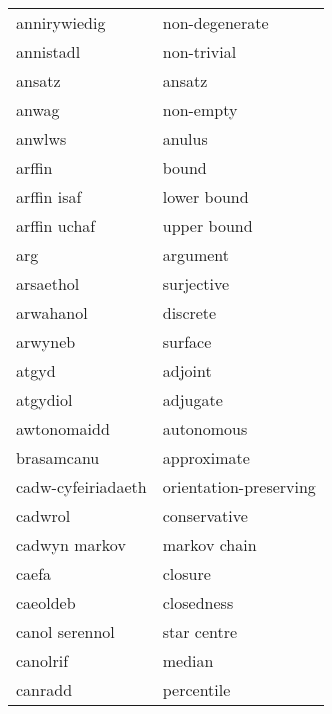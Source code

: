 \begin{supertabular}{p{0.22\textwidth}p{0.22\textwidth}}
                   annirywiedig &                   non-degenerate \\
                      annistadl &                      non-trivial \\
                         ansatz &                           ansatz \\
                          anwag &                        non-empty \\
                         anwlws &                           anulus \\
                         arffin &                            bound \\
                    arffin isaf &                      lower bound \\
                   arffin uchaf &                      upper bound \\
                            arg &                         argument \\
                      arsaethol &                       surjective \\
                      arwahanol &                         discrete \\
                        arwyneb &                          surface \\
                          atgyd &                          adjoint \\
                       atgydiol &                         adjugate \\
                    awtonomaidd &                       autonomous \\
                     brasamcanu &                      approximate \\
             cadw-cyfeiriadaeth &           orientation-preserving \\
                        cadwrol &                     conservative \\
                  cadwyn markov &                     markov chain \\
                          caefa &                          closure \\
                       caeoldeb &                       closedness \\
                 canol serennol &                      star centre \\
                       canolrif &                           median \\
                        canradd &                       percentile \\

\end{supertabular}
